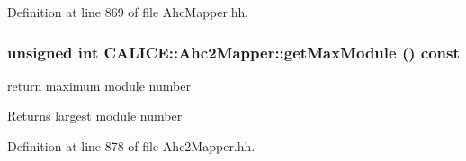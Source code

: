 Definition at line 869 of file AhcMapper.hh.
\subsubsection[{getMaxModule}]{\setlength{\rightskip}{0pt plus 5cm}unsigned int CALICE::Ahc2Mapper::getMaxModule () const\hspace{0.3cm}{\ttfamily  [inline, inherited]}}\label{group__Range_ga9467908a1215cb7f440c7501dcd683ad}


return maximum module number \begin{DoxyReturn}{Returns}
largest module number 
\end{DoxyReturn}


Definition at line 878 of file Ahc2Mapper.hh.